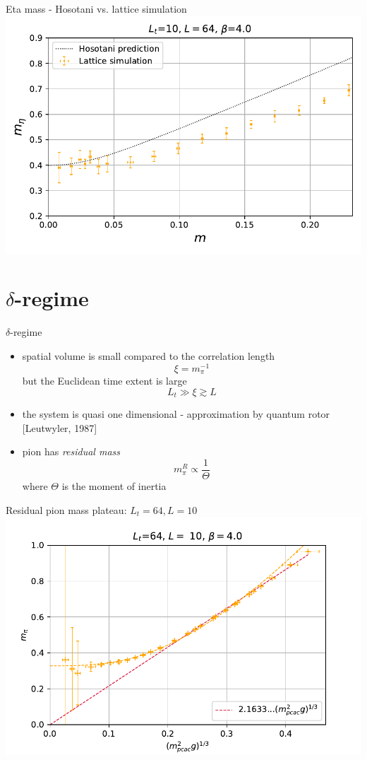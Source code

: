 \documentclass[english]{beamer}
\begin{document}
\begin{frame}{Eta mass - Hosotani vs. lattice simulation}
  \includegraphics[width=1\textwidth]{figs/Meta64x10FiniteT_Pt3}
\end{frame}


\section{$\delta$-regime}

\begin{frame}{$\delta$-regime}
  \begin{itemize}
    \item spatial volume is small compared to the correlation
      length
      \[
        \xi = m_\pi^{-1}
      \]
      but the Euclidean time extent is large
      \[
        L_t\gg \xi \gtrsim L
      \]
    \item the system is quasi one dimensional - approximation by
      quantum rotor [Leutwyler, 1987]
    \item pion has \textit{residual mass}
      \[
        m_\pi^R \propto \frac{1}{\Theta}
      \]
      where $\Theta$ is the moment of inertia
  \end{itemize}
\end{frame}

\begin{frame}{Residual pion mass plateau: $L_t = 64, L = 10$}
  \includegraphics[width=1\textwidth]{figs/Mpi10x64}
\end{frame}
\end{document}
